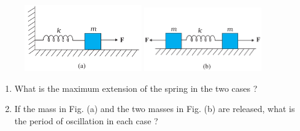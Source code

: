 \begin{enumerate}[label=\thesection.\arabic*,ref=\thesection.\theenumi]
\begin{figure}[ht]
\caption{ }
    \includegraphics[width=0.45\textwidth]{ncert-physics/11/14/13/figs/fig1.png}
    \includegraphics[width=0.45\textwidth]{ncert-physics/11/14/13/figs/fig2.png}
\end{figure}
\begin{enumerate}[label = (\alph*)]
  \item What is the maximum extension of the spring in the two cases ?    
  \item If the mass in Fig. (a) and the two masses in Fig. (b) are released, what is the
period of oscillation in each case ?
\end{enumerate}
    
\solution
\newpage


\end{enumerate}
